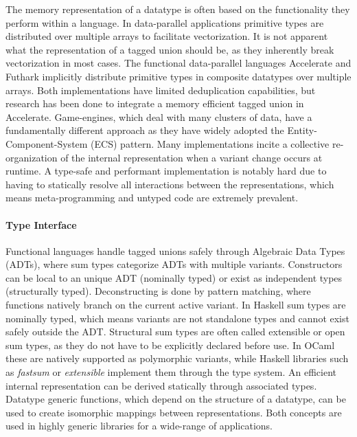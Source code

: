 \documentclass{article}
\begin{document}
The memory representation of a datatype is often based on the functionality they perform within a language.
In data-parallel applications primitive types are distributed over multiple arrays to facilitate vectorization.
It is not apparent what the representation of a tagged union should be, as they inherently break vectorization in most cases. 
The functional data-parallel languages Accelerate\cite{accelerate-sum-types} and Futhark\cite{futhark-sum-types} implicitly distribute primitive types in composite datatypes over multiple arrays.
Both implementations have limited deduplication capabilities, but research has been done to integrate a memory efficient tagged union in Accelerate\cite{accelerate-sum-types}.
Game-engines, which deal with many clusters of data, have a fundamentally different approach as they have widely adopted the Entity-Component-System (ECS) pattern. 
Many implementations incite a collective re-organization of the internal representation when a variant change occurs at runtime.
A type-safe and performant implementation is notably hard due to having to statically resolve all interactions between the representations, which means meta-programming and untyped code are extremely prevalent. 

\paragraph{Type Interface}

Functional languages handle tagged unions safely through Algebraic Data Types (ADTs), where sum types categorize ADTs with multiple variants.
Constructors can be local to an unique ADT (nominally typed) or exist as independent types (structurally typed).
Deconstructing is done by pattern matching, where functions natively branch on the current active variant.
In Haskell sum types are nominally typed, which means variants are not standalone types and cannot exist safely outside the ADT.
Structural sum types are often called extensible or open sum types, as they do not have to be explicitly declared before use.
In OCaml these are natively supported as polymorphic variants, while Haskell libraries such as {\it fastsum} or {\it extensible} implement them through the type system.
An efficient internal representation can be derived statically through associated types\cite{associated-types}.
Datatype generic functions, which depend on the structure of a datatype, can be used to create isomorphic mappings between representations.
Both concepts are used in highly generic libraries for a wide-range of applications\cite{generic-programming}. 
\end{document}
